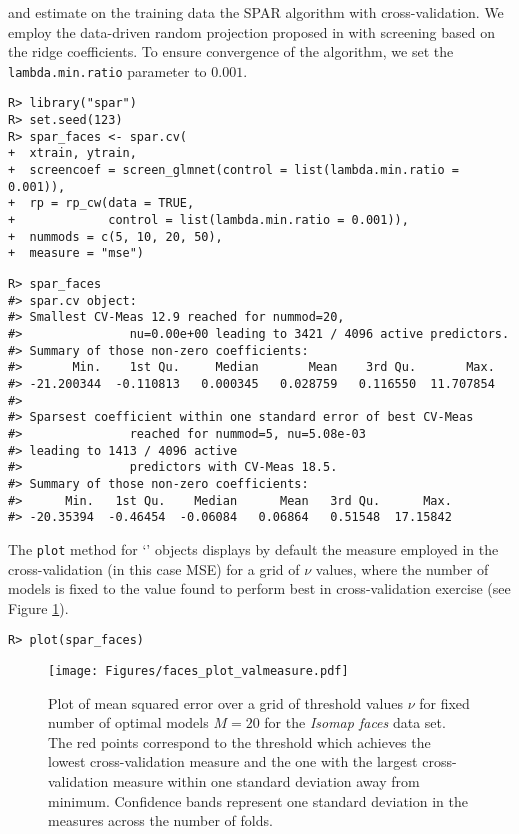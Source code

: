 \documentclass[
  article]{jss}
\newcommand{\class}[1]{`\code{#1}'}
\begin{document}
and estimate on the training data the SPAR algorithm with
cross-validation. We employ the data-driven random projection proposed
in \citet{parzer2024sparse} with screening based on the ridge
coefficients. To ensure convergence of the  algorithm, we
set the \texttt{lambda.min.ratio} parameter to \(0.001\).

\begin{verbatim}
R> library("spar")
R> set.seed(123)
R> spar_faces <- spar.cv(
+  xtrain, ytrain,
+  screencoef = screen_glmnet(control = list(lambda.min.ratio = 0.001)),
+  rp = rp_cw(data = TRUE, 
+             control = list(lambda.min.ratio = 0.001)),
+  nummods = c(5, 10, 20, 50),
+  measure = "mse")
\end{verbatim}

\begin{verbatim}
R> spar_faces
#> spar.cv object:
#> Smallest CV-Meas 12.9 reached for nummod=20,
#>               nu=0.00e+00 leading to 3421 / 4096 active predictors.
#> Summary of those non-zero coefficients:
#>       Min.    1st Qu.     Median       Mean    3rd Qu.       Max. 
#> -21.200344  -0.110813   0.000345   0.028759   0.116550  11.707854 
#> 
#> Sparsest coefficient within one standard error of best CV-Meas
#>               reached for nummod=5, nu=5.08e-03 
#> leading to 1413 / 4096 active
#>               predictors with CV-Meas 18.5.
#> Summary of those non-zero coefficients:
#>      Min.   1st Qu.    Median      Mean   3rd Qu.      Max. 
#> -20.35394  -0.46454  -0.06084   0.06864   0.51548  17.15842
\end{verbatim}

The \texttt{plot} method for \class{spar.cv} objects displays by default
the measure employed in the cross-validation (in this case MSE) for a
grid of \(\nu\) values, where the number of models is fixed to the value
found to perform best in cross-validation exercise (see Figure
\ref{fig:facesplot_valmeasure}).

\begin{verbatim}
R> plot(spar_faces)
\end{verbatim}

\begin{figure}[t!]
\centering
\texttt{[image: Figures/faces\_plot\_valmeasure.pdf]}
\caption{Plot of mean squared error over a grid of threshold values $\nu$ for fixed number of optimal models $M=20$ for the \emph{Isomap faces} data set.
The red points correspond to the threshold which achieves the lowest
cross-validation measure and the one with the largest cross-validation 
measure within one standard deviation away from minimum. Confidence bands represent one standard deviation in the measures across the number of folds. \label{fig:facesplot_valmeasure}}
\end{figure}
\end{document}
